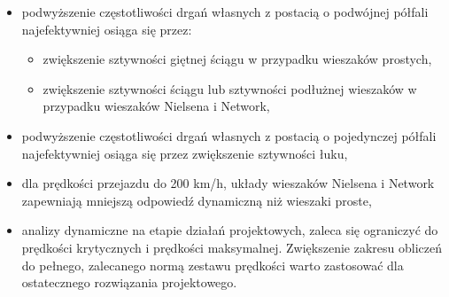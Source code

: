 \begin{itemize}
	\item podwyższenie częstotliwości drgań własnych z postacią o podwójnej półfali najefektywniej osiąga się przez: 
	\begin{itemize}
	\item zwiększenie sztywności giętnej ściągu w przypadku wieszaków prostych, 
	\item zwiększenie sztywności ściągu lub sztywności podłużnej wieszaków w przypadku wieszaków Nielsena i Network,
	\end{itemize}
	\item podwyższenie częstotliwości drgań własnych z postacią o pojedynczej półfali najefektywniej osiąga się przez zwiększenie sztywności łuku,
	\item dla prędkości przejazdu do 200 km/h, układy wieszaków Nielsena i Network zapewniają mniejszą odpowiedź dynamiczną niż wieszaki proste,
	\item analizy dynamiczne na etapie działań projektowych, zaleca się ograniczyć do prędkości krytycznych i prędkości maksymalnej. Zwiększenie zakresu obliczeń do pełnego, zalecanego normą zestawu prędkości warto zastosować dla ostatecznego rozwiązania projektowego.
\end{itemize}


